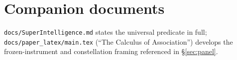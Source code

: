 \documentclass[10pt,twocolumn]{article}
\begin{document}
\section*{Companion documents}
\texttt{docs/SuperIntelligence.md} states the universal predicate in full;
\texttt{docs/paper\_latex/main.tex} (``The Calculus of Association'') develops the
frozen-instrument and constellation framing referenced in \S\ref{sec:panel}.



\end{document}
